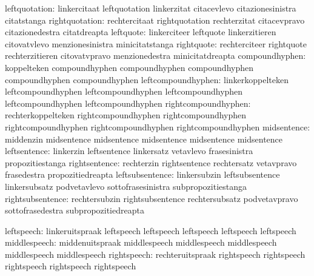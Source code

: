             leftquotation: linkercitaat              leftquotation
                           linkerzitat               citacevlevo
                           citazionesinistra         citatstanga
           rightquotation: rechtercitaat             rightquotation
                           rechterzitat              citacevpravo
                           citazionedestra           citatdreapta
                leftquote: linkerciteer              leftquote
                           linkerzitieren            citovatvlevo
                           menzionesinistra          minicitatstanga
               rightquote: rechterciteer             rightquote
                           rechterzitieren           citovatvpravo
                           menzionedestra            minicitatdreapta
     compoundhyphen: koppelteken         compoundhyphen
                     compoundhyphen      compoundhyphen
                     compoundhyphen      compoundhyphen
 leftcompoundhyphen: linkerkoppelteken   leftcompoundhyphen
                     leftcompoundhyphen  leftcompoundhyphen
                     leftcompoundhyphen  leftcompoundhyphen
rightcompoundhyphen: rechterkoppelteken  rightcompoundhyphen
                     rightcompoundhyphen rightcompoundhyphen
                     rightcompoundhyphen rightcompoundhyphen
midsentence: middenzin                 midsentence
             midsentence               midsentence
             midsentence               midsentence
             leftsentence: linkerzin                 leftsentence
                           linkersatz                vetavlevo
                           frasesinistra             propozitiestanga
            rightsentence: rechterzin                rightsentence
                           rechtersatz               vetavpravo
                           frasedestra               propozitiedreapta
          leftsubsentence: linkersubzin              leftsubsentence
                           linkersubsatz             podvetavlevo
                           sottofrasesinistra        subpropozitiestanga
         rightsubsentence: rechtersubzin             rightsubsentence
                           rechtersubsatz            podvetavpravo
                           sottofrasedestra          subpropozitiedreapta

               leftspeech: linkeruitspraak           leftspeech
                           leftspeech                leftspeech
                           leftspeech                leftspeech %
             middlespeech: middenuitspraak           middlespeech
                           middlespeech              middlespeech
                           middlespeech              middlespeech %
              rightspeech: rechteruitspraak          rightspeech
                           rightspeech               rightspeech
                           rightspeech               rightspeech %

